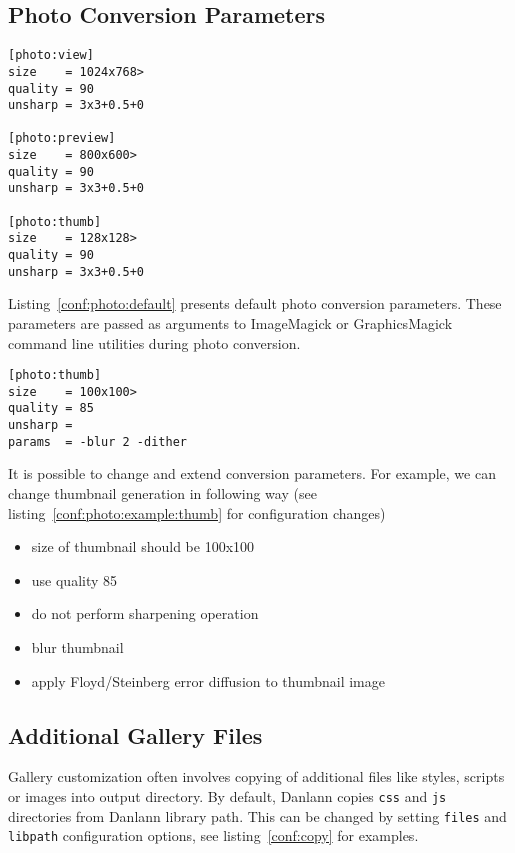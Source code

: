 \documentclass{article}
\begin{document}
\subsection{Photo Conversion Parameters}
\begin{listing}
\begin{lstlisting}
[photo:view]
size    = 1024x768>
quality = 90
unsharp = 3x3+0.5+0

[photo:preview]
size    = 800x600>
quality = 90
unsharp = 3x3+0.5+0

[photo:thumb]
size    = 128x128>
quality = 90
unsharp = 3x3+0.5+0
\end{lstlisting}
\caption{Default photo conversion parameters}\label{conf:photo:default}
\end{listing}
Listing~\ref{conf:photo:default} presents default photo conversion
parameters. These parameters are passed as arguments to ImageMagick or GraphicsMagick
command line utilities during photo conversion.

\begin{listing}
\begin{lstlisting}
[photo:thumb]
size    = 100x100>
quality = 85
unsharp =
params  = -blur 2 -dither
\end{lstlisting}
\caption{Example of custom photo conversion parameters}\label{conf:photo:example:thumb}
\end{listing}

It is possible to change and extend conversion parameters. For example, we
can change thumbnail generation in following way (see
listing~\ref{conf:photo:example:thumb} for configuration changes)
\begin{itemize}
\item size of thumbnail should be 100x100
\item use quality 85
\item do not perform sharpening operation
\item blur thumbnail 
\item apply Floyd/Steinberg error diffusion to thumbnail image
\end{itemize}

\subsection{Additional Gallery Files}
Gallery customization often involves copying of additional files like
styles, scripts or images into output directory. By default, Danlann copies
\texttt{css} and \texttt{js} directories from Danlann library path. This
can be changed by setting \texttt{files} and \texttt{libpath} configuration
options, see listing~\ref{conf:copy} for examples.
\end{document}
